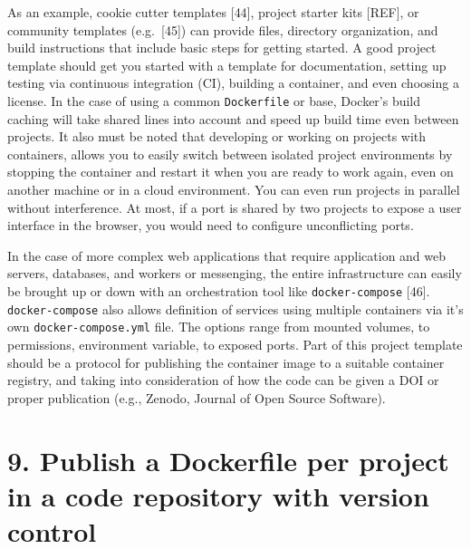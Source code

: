 \documentclass[10pt,letterpaper]{article}
\begin{document}
As an example, cookie cutter templates {[}44{]}, project starter kits
{[}REF{]}, or community templates (e.g.~{[}45{]}) can provide files,
directory organization, and build instructions that include basic steps
for getting started. A good project template should get you started with
a template for documentation, setting up testing via continuous
integration (CI), building a container, and even choosing a license. In
the case of using a common \texttt{Dockerfile} or base, Docker's build
caching will take shared lines into account and speed up build time even
between projects. It also must be noted that developing or working on
projects with containers, allows you to easily switch between isolated
project environments by stopping the container and restart it when you
are ready to work again, even on another machine or in a cloud
environment. You can even run projects in parallel without interference.
At most, if a port is shared by two projects to expose a user interface
in the browser, you would need to configure unconflicting ports.

In the case of more complex web applications that require application
and web servers, databases, and workers or messenging, the entire
infrastructure can easily be brought up or down with an orchestration
tool like \texttt{docker-compose} {[}46{]}. \texttt{docker-compose} also
allows definition of services using multiple containers via it's own
\texttt{docker-compose.yml} file. The options range from mounted
volumes, to permissions, environment variable, to exposed ports. Part of
this project template should be a protocol for publishing the container
image to a suitable container registry, and taking into consideration of
how the code can be given a DOI or proper publication (e.g., Zenodo,
Journal of Open Source Software).

\hypertarget{publish-a-dockerfile-per-project-in-a-code-repository-with-version-control}{%
\section*{9. Publish a Dockerfile per project in a code repository with
version
control}\label{publish-a-dockerfile-per-project-in-a-code-repository-with-version-control}}
\end{document}

